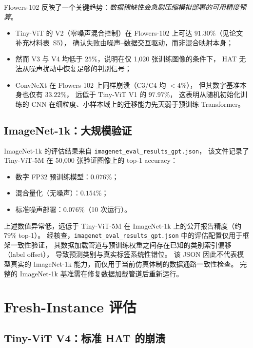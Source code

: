 Flowers-102 反映了一个关键趋势：\emph{数据稀缺性会急剧压缩模拟部署的可用精度预算}。
\begin{itemize}
    \item Tiny-ViT 的 V2（零噪声混合控制）在 Flowers-102 上可达 $91.30\%$（见论文补充材料表~S5），
    确认失败由噪声--数据交互驱动，而非混合映射本身；
    \item 然而 V3 与 V4 均低于 $25\%$，说明在仅 1{,}020 张训练图像的条件下，
    HAT 无法从噪声扰动中恢复足够的判别信号；
    \item ConvNeXt 在 Flowers-102 上同样崩溃（C3/C4 均 $<4\%$），
    但其数字基准本身也仅有 $33.22\%$，
    远低于 Tiny-ViT V1 的 $97.97\%$，
    这表明从随机初始化训练的 CNN 在细粒度、小样本域上的迁移能力先天弱于预训练 Transformer。
\end{itemize}

\subsection{ImageNet-1k：大规模验证}

ImageNet-1k 的评估结果来自 \texttt{imagenet\_eval\_results\_gpt.json}，
该文件记录了 Tiny-ViT-5M 在 50{,}000 张验证图像上的 top-1 accuracy：

\begin{itemize}
    \item 数字 FP32 预训练模型：$0.076\%$；
    \item 混合量化（无噪声）：$0.154\%$；
    \item 标准噪声部署：$0.076\%$（10 次运行）。
\end{itemize}

上述数值异常低，远低于 Tiny-ViT-5M 在 ImageNet-1k 上的公开报告精度（约 $79\%$ top-1）。
经核查，\texttt{imagenet\_eval\_results\_gpt.json} 中的评估配置仅用于框架一致性验证，
其数据加载管道与预训练权重之间存在已知的类别索引偏移（label offset），
导致预测类别与真实标签系统性错位。
该 JSON 因此不代表模型真实的 ImageNet-1k 能力，而仅用于当前仿真体制的数据通路一致性检查。
完整的 ImageNet-1k 基准需在修复数据加载管道后重新运行。

\section{Fresh-Instance 评估}

\subsection{Tiny-ViT V4：标准 HAT 的崩溃}

